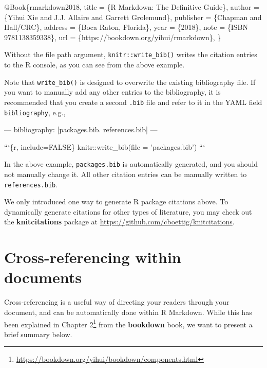 \documentclass[
  11pt,
]{krantz}
\newenvironment{Shaded}{\begin{snugshade}}{\end{snugshade}}
\newcommand{\BaseNTok}[1]{\textcolor[rgb]{0.06,0.06,0.06}{#1}}
\newcommand{\DataTypeTok}[1]{\textcolor[rgb]{0.27,0.27,0.27}{#1}}
\newcommand{\NormalTok}[1]{#1}
\newcommand{\OtherTok}[1]{\textcolor[rgb]{0.37,0.37,0.37}{#1}}
\newcommand{\VariableTok}[1]{\textcolor[rgb]{0,0,0}{#1}}
\renewcommand{\href}[2]{#2\footnote{\url{#1}}}
\begin{document}
\begin{Shaded}
\begin{Highlighting}[]
\VariableTok{@Book}\NormalTok{\{}\OtherTok{rmarkdown2018}\NormalTok{,}
  \DataTypeTok{title}\NormalTok{ = \{R Markdown: The Definitive Guide\},}
  \DataTypeTok{author}\NormalTok{ = \{Yihui Xie and J.J. Allaire and Garrett Grolemund\},}
  \DataTypeTok{publisher}\NormalTok{ = \{Chapman and Hall/CRC\},}
  \DataTypeTok{address}\NormalTok{ = \{Boca Raton, Florida\},}
  \DataTypeTok{year}\NormalTok{ = \{2018\},}
  \DataTypeTok{note}\NormalTok{ = \{ISBN 9781138359338\},}
  \DataTypeTok{url}\NormalTok{ = \{https://bookdown.org/yihui/rmarkdown\},}
\NormalTok{\}}
\end{Highlighting}
\end{Shaded}

Without the file path argument, \texttt{knitr::write\_bib()} writes the citation entries to the R console, as you can see from the above example.

Note that \texttt{write\_bib()} is designed to overwrite the existing bibliography file. If you want to manually add any other entries to the bibliography, it is recommended that you create a second \texttt{.bib} file and refer to it in the YAML field \texttt{bibliography}, e.g.,

\begin{Shaded}
\begin{Highlighting}[]
\NormalTok{---}
\NormalTok{bibliography: [packages.bib. references.bib]}
\NormalTok{---}

\BaseNTok{```\{r, include=FALSE\}}
\BaseNTok{knitr::write_bib(file = 'packages.bib')}
\BaseNTok{```}
\end{Highlighting}
\end{Shaded}

In the above example, \texttt{packages.bib} is automatically generated, and you should not manually change it. All other citation entries can be manually written to \texttt{references.bib}.

We only introduced one way to generate R package citations above. To dynamically generate citations for other types of literature, you may check out the \textbf{knitcitations} package at \url{https://github.com/cboettig/knitcitations}.

\hypertarget{cross-ref}{%
\section{Cross-referencing within documents}\label{cross-ref}}

Cross-referencing is a useful way of directing your readers through your document, and can be automatically done within R Markdown. While this has been explained in \href{https://bookdown.org/yihui/bookdown/components.html}{Chapter 2} from the \textbf{bookdown} book, we want to present a brief summary below.
\end{document}
